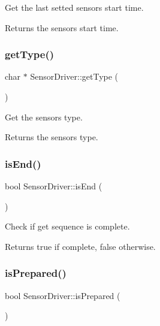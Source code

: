 Get the last setted sensor\textquotesingle{}s start time. 

\begin{DoxyReturn}{Returns}
the sensor\textquotesingle{}s start time. 
\end{DoxyReturn}
\mbox{\label{classSensorDriver_a3d87944d9f86320f645af7dad549e4a8}} 
\subsubsection{\texorpdfstring{get\+Type()}{getType()}}
{\footnotesize\ttfamily char $\ast$ Sensor\+Driver\+::get\+Type (\begin{DoxyParamCaption}{ }\end{DoxyParamCaption})}



Get the sensor\textquotesingle{}s type. 

\begin{DoxyReturn}{Returns}
the sensor\textquotesingle{}s type. 
\end{DoxyReturn}
\mbox{\label{classSensorDriver_a8ababf180e52d684416bc6f4c4f90e59}} 
\subsubsection{\texorpdfstring{is\+End()}{isEnd()}}
{\footnotesize\ttfamily bool Sensor\+Driver\+::is\+End (\begin{DoxyParamCaption}{ }\end{DoxyParamCaption})}



Check if get sequence is complete. 

\begin{DoxyReturn}{Returns}
true if complete, false otherwise. 
\end{DoxyReturn}
\mbox{\label{classSensorDriver_a17672e5f12749c3dca5d6c2c4b73b7c3}} 
\subsubsection{\texorpdfstring{is\+Prepared()}{isPrepared()}}
{\footnotesize\ttfamily bool Sensor\+Driver\+::is\+Prepared (\begin{DoxyParamCaption}{ }\end{DoxyParamCaption})\hspace{0.3cm}{\ttfamily [virtual]}}



